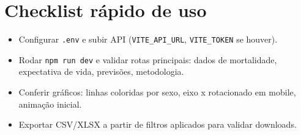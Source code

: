 \documentclass[12pt,a4paper]{article}
\begin{document}
\section{Checklist rápido de uso}
\begin{itemize}[leftmargin=*]
  \item Configurar \texttt{.env} e subir API (\texttt{VITE\_API\_URL}, \texttt{VITE\_TOKEN} se houver).
  \item Rodar \texttt{npm run dev} e validar rotas principais: dados de mortalidade, expectativa de vida, previsões, metodologia.
  \item Conferir gráficos: linhas coloridas por sexo, eixo x rotacionado em mobile, animação inicial.
  \item Exportar CSV/XLSX a partir de filtros aplicados para validar downloads.
\end{itemize}
\end{document}

